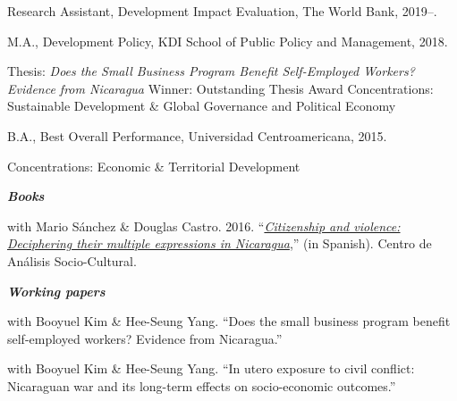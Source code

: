 \documentclass[11pt,article,oneside, a4paper]{memoir}
\begin{document}
\ind Research Assistant, Development Impact Evaluation, The World Bank, 2019--.

\bigskip

\ind M.A., Development Policy, KDI School of Public Policy and Management, 2018. 

\ind \hspace{0.35in} \footnotesize Thesis: \emph{Does the Small Business Program Benefit Self-Employed Workers? Evidence from Nicaragua} \newline Winner: Outstanding Thesis Award \newline Concentrations: Sustainable Development \& Global Governance and Political Economy \normalsize \vspace{0.01in}

\ind B.A., Best Overall Performance, Universidad Centroamericana, 2015.

\ind \hspace{0.35in} \footnotesize Concentrations: Economic \& Territorial Development \normalsize \vspace{0.01in}

\bigskip

\noindent\emph{\textbf{Books} \vspace{0.01in}}

\ind with Mario Sánchez \& Douglas Castro. 2016. ``\emph{\href{http://biblioteca.clacso.edu.ar/Nicaragua/casc-uca/20150313124733/Ciudadania-y-violencia.pdf}{Citizenship and violence: Deciphering their multiple expressions in Nicaragua}},'' (in Spanish). Centro de Análisis Socio-Cultural. \vspace{0.05in} \normalsize

\medskip
\noindent\emph{\textbf{Working papers} \vspace{0.05in}}

\ind with Booyuel Kim \& Hee-Seung Yang. ``Does the small business program benefit self-employed workers? Evidence from Nicaragua.''

\ind with Booyuel Kim \& Hee-Seung Yang. ``In utero exposure to civil conflict: Nicaraguan war and its long-term effects on socio-economic outcomes.''
\end{document}
